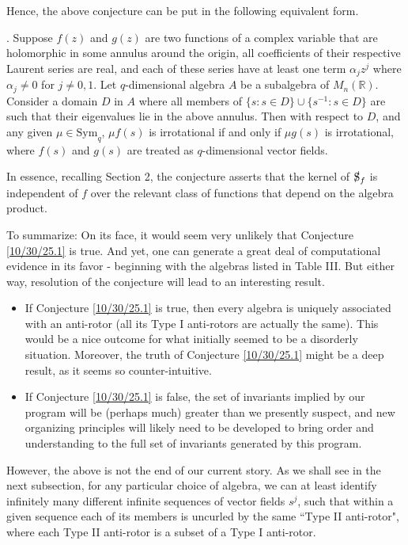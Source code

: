 \documentclass{amsart}
\theoremstyle{definition}
\numberwithin{theorem}{section}
\numberwithin{equation}{section}
\begin{document}
Hence, the above conjecture can be put in the following equivalent form.

\medskip

.  Suppose $f(z)$ and $g(z)$ are two functions of a complex variable that are holomorphic in some annulus around the origin, all coefficients of their respective Laurent series are real, and each of these series have at least one term $\alpha_j z^j$ where $\alpha_j\ne 0$ for $j\ne 0,1$.  Let $q$-dimensional algebra $A$ be a subalgebra of $M_n(\mathbb{R})$.  Consider a domain $D$ in $A$ where all members of \mbox{$\{s: s\in D\}\cup \{s^{-1}: s\in D\}$} are such that their eigenvalues lie in the above annulus.   Then with respect to $D$, and any given $\mu\in \text{Sym}_q$, $\mu f(s)$ is irrotational if and only if $\mu g(s)$ is irrotational, where $f(s)$ and $g(s)$ are treated as $q$-dimensional vector fields. 

\medskip

In essence, recalling Section 2, the conjecture asserts that the kernel of $\slashed{\text{S}}_f$ is independent of $f$ over the relevant class of functions that depend on the algebra product. 

To summarize: On its face, it would seem very unlikely that Conjecture \ref{10/30/25.1} is true.  And yet, one can generate a great deal of computational evidence in its favor - beginning with the algebras listed in Table III.   But either way, resolution of the conjecture will lead to an interesting result.
\begin{itemize}\item If Conjecture \ref{10/30/25.1} is true, then every algebra is uniquely associated with an anti-rotor (all its Type I anti-rotors are actually the same).  This would be a nice outcome for what initially seemed to be a disorderly situation.  Moreover, the truth of Conjecture \ref{10/30/25.1} might be a deep result, as it seems so counter-intuitive.  \item
If Conjecture \ref{10/30/25.1} is false, the set of invariants implied by our program will be (perhaps much) greater than we presently suspect, and new organizing principles will likely need to be developed to bring order and understanding to the full set of invariants generated by this program.
\end{itemize} 

However, the above is not the end of our current story.  As we shall see in the next subsection, for any particular choice of algebra, we can at least identify infinitely many different infinite sequences of vector fields $s^j$, such that within a given sequence each of its members is uncurled by the same ``Type II anti-rotor", where each Type II anti-rotor is a subset of a Type I anti-rotor.
\end{document}
